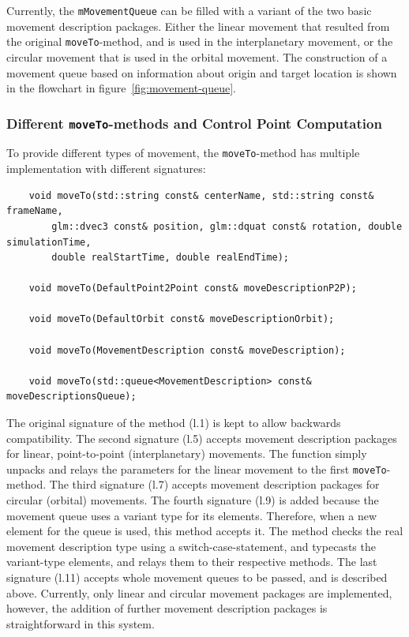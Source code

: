 Currently, the \texttt{mMovementQueue} can be filled with a variant of the two basic movement description
packages.
Either the linear movement that resulted from the original \texttt{moveTo}-method, and is used in the
interplanetary movement, or the circular movement that is used in the orbital movement.
The construction of a movement queue based on information about origin and target location is shown in the
flowchart in figure~\ref{fig:movement-queue}.

\subsubsection{Different \texttt{moveTo}-methods and Control Point Computation}\label{subsubsec:different-moveto-methods-and-control-point-computation}

To provide different types of movement, the \texttt{moveTo}-method has multiple implementation with different
signatures:
\begin{verbatim}
    void moveTo(std::string const& centerName, std::string const& frameName,
        glm::dvec3 const& position, glm::dquat const& rotation, double simulationTime,
        double realStartTime, double realEndTime);

    void moveTo(DefaultPoint2Point const& moveDescriptionP2P);

    void moveTo(DefaultOrbit const& moveDescriptionOrbit);

    void moveTo(MovementDescription const& moveDescription);

    void moveTo(std::queue<MovementDescription> const& moveDescriptionsQueue);
\end{verbatim}
The original signature of the method (l.\@1) is kept to allow backwards compatibility.
The second signature (l.\@5) accepts movement description packages for linear, point-to-point (interplanetary)
movements.
The function simply unpacks and relays the parameters for the linear movement to the first \texttt{moveTo}-method.
The third signature (l.\@7) accepts movement description packages for circular (orbital) movements.
The fourth signature (l.\@9) is added because the movement queue uses a variant type for its elements.
Therefore, when a new element for the queue is used, this method accepts it.
The method checks the real movement description type using a switch-case-statement, and typecasts the variant-type
elements, and relays them to their respective methods.
The last signature (l.\@11) accepts whole movement queues to be passed, and is described above.
Currently, only linear and circular movement packages are implemented, however, the addition of further movement
description packages is straightforward in this system.


